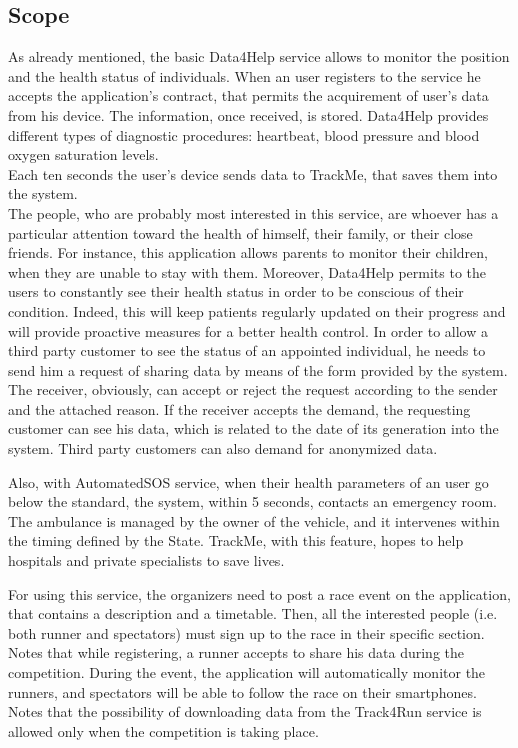 \subsection{Scope}
As already mentioned, the basic Data4Help service allows to monitor the position and the health status of individuals. When an user registers to the service he accepts the application's contract, that permits the acquirement of user's data from his device. The information, once received, is stored. Data4Help provides different types of diagnostic procedures:  heartbeat, blood pressure and blood oxygen saturation levels.\\ 
Each ten seconds the user's device sends data to TrackMe, that saves them into the system. \\ 
The people, who are probably most interested in this service, are whoever has a particular attention toward the health of himself, their family, or their close friends.
For instance, this application allows parents to monitor their children, when they are unable to stay with them. 
Moreover, Data4Help permits to the users to constantly see their health status in order to be conscious of their condition. Indeed, this will keep patients regularly updated on their progress and will provide proactive measures for a better health control. 
In order to allow a third party customer to see the status of an appointed individual, he needs to send him a request of sharing data by means of the form provided by the system. 
The receiver, obviously, can accept or reject the request according to the sender and the attached reason. 
If the receiver accepts the demand, the requesting customer can see his data, which is related to the date of its generation into the system. Third party customers can also demand for anonymized data. \\ 

\par
Also, with AutomatedSOS service, when their health parameters of an user go below the standard, the system, within 5 seconds, contacts an emergency room.
The ambulance is managed by the owner of the vehicle, and it intervenes within the timing defined by the State.
TrackMe, with this feature, hopes to help hospitals and private specialists to save lives.

\par
For using this service, the organizers need to post a race event on the application, that contains a description and a timetable. 
Then, all the interested people (i.e. both runner and spectators) must sign up to the race in their specific section. 
Notes that while registering, a runner accepts to share his data during the competition. 
During the event, the application will automatically monitor the runners, and spectators will be able to follow the race on their smartphones. 
Notes that the possibility of downloading data from the Track4Run service is allowed only when the competition is taking place. \\
